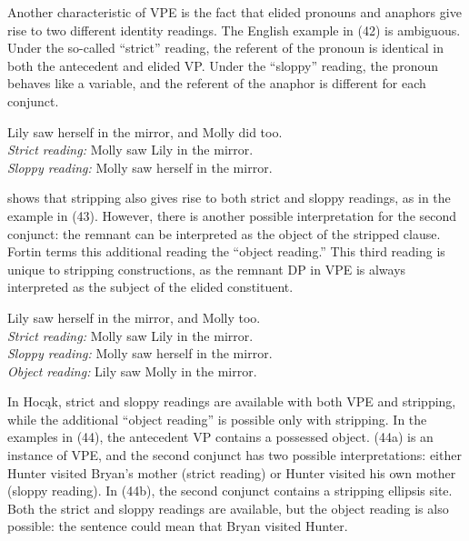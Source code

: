 \documentclass[output=paper]{LSP/langsci}
\begin{document}
Another characteristic of VPE is the fact that elided pronouns and anaphors give rise to two different identity readings. The English example in (42) is ambiguous. Under the so-called ``strict'' reading, the referent of the pronoun is identical in both the antecedent and elided VP. Under the ``sloppy'' reading, the pronoun behaves like a variable, and the referent of the anaphor is different for each conjunct.

\begin{exe}
\ex
Lily saw herself in the mirror, and Molly did too.\\
\textit{Strict reading:} Molly saw Lily in the mirror.\\
\textit{Sloppy reading:} Molly saw herself in the mirror.
\end{exe}

\citealt{Fortin2007} shows that stripping also gives rise to both strict and sloppy readings, as in the example in (43). However, there is another possible interpretation for the second conjunct: the remnant can be interpreted as the object of the stripped clause. Fortin terms this additional reading the ``object reading.'' This third reading is unique to stripping constructions, as the remnant DP in VPE is always interpreted as the subject of the elided constituent. 

\begin{exe}
\ex
Lily saw herself in the mirror, and Molly too.\\
\textit{Strict reading:} Molly saw Lily in the mirror.\\
\textit{Sloppy reading:} Molly saw herself in the mirror.\\
\textit{Object reading:} Lily saw Molly in the mirror.
\end{exe}

In Hocąk, strict and sloppy readings are available with both VPE and stripping, while the additional ``object reading'' is possible only with stripping. In the examples in (44), the antecedent VP contains a possessed object. (44a) is an instance of VPE, and the second conjunct has two possible interpretations: either Hunter visited Bryan's mother (strict reading) or Hunter visited his own mother (sloppy reading). In (44b), the second conjunct contains a stripping ellipsis site. Both the strict and sloppy readings are available, but the object reading is also possible: the sentence could mean that Bryan visited Hunter.
\end{document}
